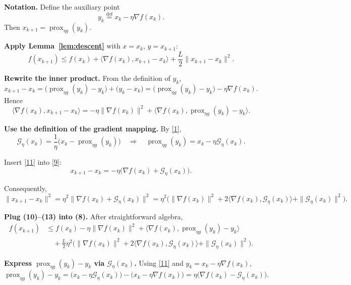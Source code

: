 \documentclass{article}
\begin{document}
\begin{enumerate}[label={[\textbf{Step \arabic*.}]},leftmargin=*,align=left]
\item \textbf{Notation.} Define the auxiliary point 
\[
y_k\stackrel{\text{def}}{=}x_k-\eta\nabla f(x_k).
\tag{7}
\]
Then $x_{k+1}= \operatorname{prox}_{\eta g}(y_k)$.

\item \textbf{Apply Lemma~\ref{lem:descent}} with $x=x_k$, $y=x_{k+1}$:
\[
f(x_{k+1})\le f(x_k)+\langle\nabla f(x_k),x_{k+1}-x_k\rangle+\frac{L}{2}\|x_{k+1}-x_k\|^{2}.
\tag{8}
\]

\item \textbf{Rewrite the inner product.} From the definition of $y_k$,
\[
x_{k+1}-x_k = \big(\operatorname{prox}_{\eta g}(y_k)-y_k\big)+\big(y_k-x_k\big)
               = \big(\operatorname{prox}_{\eta g}(y_k)-y_k\big)-\eta\nabla f(x_k).
\tag{9}
\]
Hence
\[
\langle\nabla f(x_k),x_{k+1}-x_k\rangle
= -\eta\|\nabla f(x_k)\|^{2}
  +\langle\nabla f(x_k),\operatorname{prox}_{\eta g}(y_k)-y_k\rangle .
\tag{10}
\]

\item \textbf{Use the definition of the gradient mapping.} By \eqref{1},
\[
\mathcal{G}_{\eta}(x_k)=\frac{1}{\eta}\big(x_k-\operatorname{prox}_{\eta g}(y_k)\big)
\quad\Longrightarrow\quad
\operatorname{prox}_{\eta g}(y_k)=x_k-\eta\mathcal{G}_{\eta}(x_k).
\tag{11}
\]

Insert \eqref{11} into \eqref{9}:
\[
x_{k+1}-x_k = -\eta\big(\nabla f(x_k)+\mathcal{G}_{\eta}(x_k)\big).
\tag{12}
\]

Consequently,
\[
\|x_{k+1}-x_k\|^{2}= \eta^{2}\big\|\nabla f(x_k)+\mathcal{G}_{\eta}(x_k)\big\|^{2}
                 =\eta^{2}\big(\|\nabla f(x_k)\|^{2}+2\langle\nabla f(x_k),\mathcal{G}_{\eta}(x_k)\rangle+\|\mathcal{G}_{\eta}(x_k)\|^{2}\big).
\tag{13}
\]

\item \textbf{Plug (10)–(13) into (8).} After straightforward algebra,
\[
\begin{aligned}
f(x_{k+1}) &\le f(x_k)
            -\eta\|\nabla f(x_k)\|^{2}
            +\langle\nabla f(x_k),\operatorname{prox}_{\eta g}(y_k)-y_k\rangle \\
           &\quad+\frac{L}{2}\eta^{2}\Big(\|\nabla f(x_k)\|^{2}
           +2\langle\nabla f(x_k),\mathcal{G}_{\eta}(x_k)\rangle
           +\|\mathcal{G}_{\eta}(x_k)\|^{2}\Big).
\end{aligned}
\tag{14}
\]

\item \textbf{Express $\operatorname{prox}_{\eta g}(y_k)-y_k$ via $\mathcal{G}_{\eta}(x_k)$.} Using \eqref{11} and $y_k=x_k-\eta\nabla f(x_k)$,
\[
\operatorname{prox}_{\eta g}(y_k)-y_k
= \big(x_k-\eta\mathcal{G}_{\eta}(x_k)\big)-\big(x_k-\eta\nabla f(x_k)\big)
= \eta\big(\nabla f(x_k)-\mathcal{G}_{\eta}(x_k)\big).
\tag{15}
\]


\end{enumerate}
\end{document}
